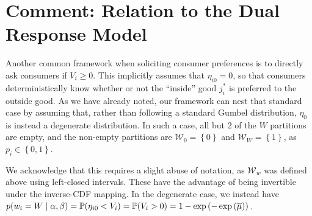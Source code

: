 \documentclass{article}
\begin{document}
\section*{Comment: Relation to the \textcite{Brazell_2006} Dual Response Model}

Another common framework when soliciting consumer preferences is to directly ask consumers if $V_i \ge 0$. This implicitly assumes that $\eta_{i0} = 0$, so that consumers deterministically know whether or not the ``inside'' good $j^*_i$ is preferred to the outside good. As we have already noted, our framework can nest that standard case by assuming that, rather than following a standard Gumbel distribution, $\eta_0$ is instead a degenerate distribution. In such a case, all but 2 of the $W$ partitions are empty, and the non-empty partitions are $\mathcal{W}_0 = \left\lbrace 0 \right\rbrace$ and $\mathcal{W}_W = \left\lbrace 1\right\rbrace$, as $p_i \in \left\lbrace 0, 1\right\rbrace$.

We acknowledge that this requires a slight abuse of notation, as $\mathcal{W}_w$ was defined above using left-closed intervals. These have the advantage of being invertible under the inverse-CDF mapping. In the degenerate case, we instead have $p\mleft(w_i = W\mid\alpha,\beta\mright) = \mathbb{P}\mleft(\eta_{i0} < V_i\mright) = \mathbb{P}\mleft(V_i > 0\mright) = 1 - \exp\left(-\exp\left(\overline{\mu}\right)\right)$.
\end{document}
